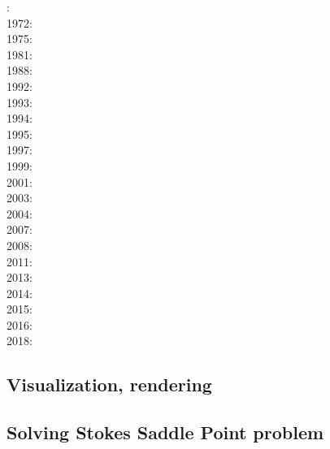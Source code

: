 {\scriptsize
{}: \cite{ramb68}\\
1972: \cite{bers72}\\
1975: \cite{dixo75}\\
1981: \cite{brpo81}\\
1988: \cite{sccm88}\\
1992: \cite{vayv92}\cite{zaju92}\cite{wein92}\cite{wesc92}\cite{veja92}\\
1993: \cite{kesb93}\cite{nabr93}\cite{potp93}\cite{povp93}\cite{vasv93}\cite{pocp93}
      \cite{popt93}\cite{wein93}\cite{vayv93}\\
1994: \cite{wepo94}\\
1995: \cite{wepo95}\cite{bisc95}\cite{wepo95}\\
1997: \cite{wein97}\\
1999: \cite{drdv99}\\
2001: \cite{kapo01}\cite{drvc01}\\
2003: \cite{geur03}\cite{vavd03}\\
2004: \cite{gepm04}\cite{istt04}\cite{geur04}\\
2007: \cite{gebu07}\\
2008: \cite{buge08}\cite{zlfd08}\cite{mohc98}\\
2011: \cite{ellw11}\cite{pege11}\\
2013: \cite{fusc13}\\
2014: \cite{feka14b}\\
2015: \cite{feka15}\cite{fuks15}\\
2016: \cite{cakp16}\\
2018: \cite{gesr18}
}

\subsection{Visualization, rendering}

{\scriptsize
\noindent
\cite{faha}
\cite{chzy08}\cite{stmt08}\cite{bikh08}
\cite{may12}
\cite{cram18}
}

\subsection{Solving Stokes Saddle Point problem}

